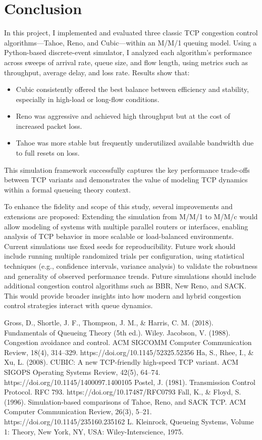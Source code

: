 \documentclass[conference]{IEEEtran}
\begin{document}
\section{Conclusion}
In this project, I implemented and evaluated three classic TCP congestion control algorithms—Tahoe, Reno, and Cubic—within an M/M/1 queuing model. 
Using a Python-based discrete-event simulator, I analyzed each algorithm’s performance across sweeps of arrival rate, queue size, and flow length, using metrics such as throughput, average delay, and loss rate.
Results show that:
\begin{itemize}[]
    \item Cubic consistently offered the best balance between efficiency and stability, especially in high-load or long-flow conditions.
    \item Reno was aggressive and achieved high throughput but at the cost of increased packet loss.
    \item Tahoe was more stable but frequently underutilized available bandwidth due to full resets on loss.
\end{itemize}

This simulation framework successfully captures the key performance trade-offs between TCP variants and demonstrates the value of modeling TCP dynamics within a formal queueing theory context.

To enhance the fidelity and scope of this study, several improvements and extensions are proposed:
Extending the simulation from M/M/1 to M/M/c would allow modeling of systems with multiple parallel routers or interfaces, enabling analysis of TCP behavior in more scalable or load-balanced environments.
Current simulations use fixed seeds for reproducibility. Future work should include running multiple randomized trials per configuration, using statistical techniques (e.g., confidence intervals, variance analysis) to validate the robustness and generality of observed performance trends.
Future simulations should include additional congestion control algorithms such as BBR, New Reno, and SACK. This would provide broader insights into how modern and hybrid congestion control strategies interact with queue dynamics.

\begin{thebibliography}{00}
 Gross, D., Shortle, J. F., Thompson, J. M., \& Harris, C. M. (2018). Fundamentals of Queueing Theory (5th ed.). Wiley.
 Jacobson, V. (1988). Congestion avoidance and control. ACM SIGCOMM Computer Communication Review, 18(4), 314–329. https://doi.org/10.1145/52325.52356
 Ha, S., Rhee, I., \& Xu, L. (2008). CUBIC: A new TCP-friendly high-speed TCP variant. ACM SIGOPS Operating Systems Review, 42(5), 64–74. https://doi.org/10.1145/1400097.1400105
 Postel, J. (1981). Transmission Control Protocol. RFC 793. https://doi.org/10.17487/RFC0793
 Fall, K., \& Floyd, S. (1996). Simulation-based comparisons of Tahoe, Reno, and SACK TCP. ACM Computer Communication Review, 26(3), 5–21. https://doi.org/10.1145/235160.235162
 L. Kleinrock, Queueing Systems, Volume 1: Theory, New York, NY, USA: Wiley-Interscience, 1975.
\end{thebibliography}
\end{document}
